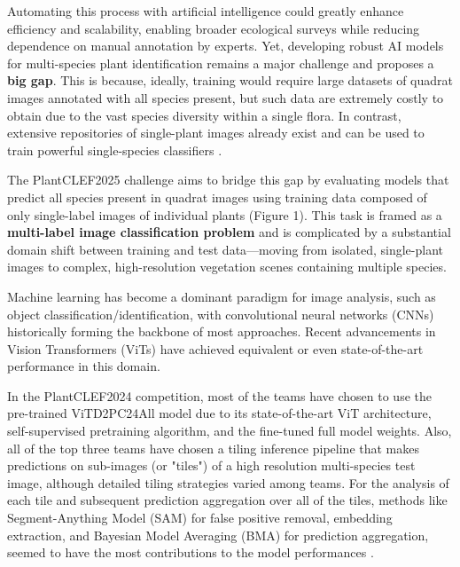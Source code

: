 \documentclass[conference]{IEEEtran}
\begin{document}
    Automating this process with artificial intelligence could greatly enhance efficiency and scalability, enabling broader ecological surveys while reducing dependence on manual annotation by experts. Yet, developing robust AI models for multi-species plant identification remains a major challenge and proposes a \textbf{big gap}. This is because, ideally, training would require large datasets of quadrat images annotated with all species present, but such data are extremely costly to obtain due to the vast species diversity within a single flora. In contrast, extensive repositories of single-plant images already exist and can be used to train powerful single-species classifiers \cite{goeau2024overviewplantclef2024multispecies}\cite{martellucci2025overviewplantclef2025multispecies}.
    
    The PlantCLEF2025 challenge aims to bridge this gap by evaluating models that predict all species present in quadrat images using training data composed of only single-label images of individual plants (Figure 1). This task is framed as a \textbf{multi-label image classification problem} and is complicated by a substantial domain shift between training and test data—moving from isolated, single-plant images to complex, high-resolution vegetation scenes containing multiple species.

    Machine learning has become a dominant paradigm for image analysis, such as object classification/identification, with convolutional neural networks (CNNs) historically forming the backbone of most approaches. Recent advancements in Vision Transformers (ViTs) have achieved equivalent or even state-of-the-art performance in this domain.  

    In the PlantCLEF2024 competition, most of the teams have chosen to use the pre-trained ViTD2PC24All model due to its state-of-the-art ViT architecture, self-supervised pretraining algorithm, and the fine-tuned full model weights.  Also, all of the top three teams have chosen a tiling inference pipeline that makes predictions on sub-images (or "tiles") of a high resolution multi-species test image, although detailed tiling strategies varied among teams\cite{goeau2024overviewplantclef2024multispecies}. For the analysis of each tile and subsequent prediction aggregation over all of the tiles, methods like Segment-Anything Model (SAM) for false positive removal\cite{foy2024-1stplace}, embedding extraction\cite{gustineli2024-3rdplace}, and Bayesian Model Averaging (BMA) for prediction aggregation\cite{Chulif2024-2ndplace}, seemed to have the most contributions to the model performances .
\end{document}
